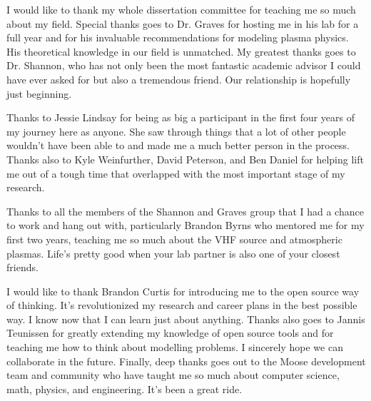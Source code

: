\begin{acknowledgements}
I would like to thank my whole dissertation committee for teaching me so much about my field. Special thanks goes to Dr. Graves for hosting me in his lab for a full year and for his invaluable recommendations for modeling plasma physics. His theoretical knowledge in our field is unmatched. My greatest thanks goes to Dr. Shannon, who has not only been the most fantastic academic advisor I could have ever asked for but also a tremendous friend. Our relationship is hopefully just beginning.

Thanks to Jessie Lindsay for being as big a participant in the first four years of my journey here as anyone. She saw through things that a lot of other people wouldn't have been able to and made me a much better person in the process. Thanks also to Kyle Weinfurther, David Peterson, and Ben Daniel for helping lift me out of a tough time that overlapped with the most important stage of my research.

Thanks to all the members of the Shannon and Graves group that I had a chance to work and hang out with, particularly Brandon Byrns who mentored me for my first two years, teaching me so much about the VHF source and atmospheric plasmas. Life's pretty good when your lab partner is also one of your closest friends.

I would like to thank Brandon Curtis for introducing me to the open source way of thinking. It's revolutionized my research and career plans in the best possible way. I know now that I can learn just about anything. Thanks also goes to Jannis Teunissen for greatly extending my knowledge of open source tools and for teaching me how to think about modelling problems. I sincerely hope we can collaborate in the future. Finally, deep thanks goes out to the Moose development team and community who have taught me so much about computer science, math, physics, and engineering. It's been a great ride.
\end{acknowledgements}


\thesistableofcontents

\thesislistoftables

\thesislistoffigures

